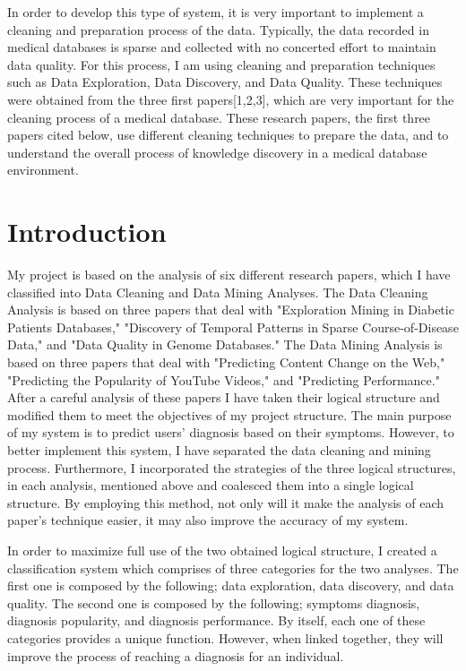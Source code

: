 \documentclass[sts]{sig-alternate}
\begin{document}
	In order to develop this type of system, it is very important to implement a cleaning and 				preparation 	process of the data. Typically, the data recorded in medical databases is sparse and 			collected with no concerted effort to maintain data quality. For this process, I am using cleaning 		and preparation techniques such as Data Exploration, Data Discovery, and Data Quality. These 				techniques were obtained from the three first papers[1,2,3], which are very important for the 			cleaning process of a medical database. These research papers, the first three papers cited below, 		use different cleaning techniques to prepare the data, and to understand the overall process of 			knowledge discovery in a medical database environment.

\section{Introduction}
	\label{Introduction}

	My project is based on the analysis of six different research papers, which I have classified into 		Data Cleaning and Data Mining Analyses. The Data Cleaning Analysis is based on three 	papers that 			deal with "Exploration Mining in Diabetic Patients Databases," "Discovery of Temporal Patterns in 		Sparse Course-of-Disease Data," and "Data Quality in Genome Databases." The Data Mining Analysis is 		based on three papers that deal with "Predicting Content Change on the Web," "Predicting the 				Popularity of YouTube Videos," and "Predicting Performance." After a careful analysis of these 			papers I have taken their logical structure and modified them to meet the objectives of my project 		structure. The main purpose of my system is to predict users' diagnosis based on their symptoms. 			However, to better implement this system, I have separated the data cleaning and mining process. 			Furthermore, I incorporated the strategies of the three logical structures, in each analysis, 			mentioned above and 	coalesced them into a single logical structure. By employing this method, not 		only will it make the analysis of each paper's technique easier, it may also improve the accuracy of 	my system.\newline

	In order to maximize full use of the two obtained logical structure, I created a classification 			system which comprises of three categories for the two analyses. The first one is composed by the 		following; data exploration, data discovery, and data quality. The second one is composed by the 			following; symptoms diagnosis, diagnosis popularity, and diagnosis performance. By itself, each one 		of these categories provides a unique function. However, when linked together, they will improve the 	process of reaching a diagnosis for an individual.
\end{document}
